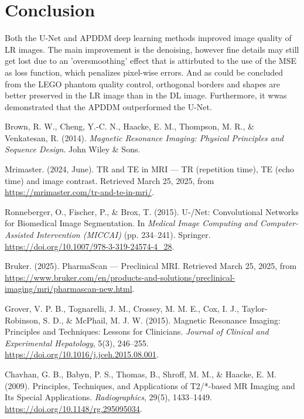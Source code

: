 \documentclass[twocolumn]{article}
\begin{document}
\section{Conclusion}

Both the U-Net and APDDM deep learning methods improved image quality of LR images. The main improvement is the denoising, however fine details may still get lost due to an 'oversmoothing' effect that is attirbuted to the use of the MSE as loss function, which penalizes pixel-wise errors. And as could be concluded from the LEGO phantom quality control, orthogonal borders and shapes are better preserved in the LR image than in the DL image.
Furthermore, it wwas demonstrated that the APDDM outperformed the U-Net.


\newpage
\onecolumn
\nocite{*}
\begin{thebibliography}{99}

     Brown, R. W., Cheng, Y.-C. N., Haacke, E. M., Thompson, M. R., \& Venkatesan, R. (2014). \textit{Magnetic Resonance Imaging: Physical Principles and Sequence Design}. John Wiley \& Sons.
    
     Mrimaster. (2024, June). TR and TE in MRI — TR (repetition time), TE (echo time) and image contrast. Retrieved March 25, 2025, from \url{https://mrimaster.com/tr-and-te-in-mri/}.
    
     Ronneberger, O., Fischer, P., \& Brox, T. (2015). U-/Net: Convolutional Networks for Biomedical Image Segmentation. In \textit{Medical Image Computing and Computer-Assisted Intervention (MICCAI)} (pp. 234–241). Springer. \url{https://doi.org/10.1007/978-3-319-24574-4_28}.
    
     Bruker. (2025). PharmaScan — Preclinical MRI. Retrieved March 25, 2025, from \url{https://www.bruker.com/en/products-and-solutions/preclinical-imaging/mri/pharmascan-new.html}.
    
     Grover, V. P. B., Tognarelli, J. M., Crossey, M. M. E., Cox, I. J., Taylor-Robinson, S. D., \& McPhail, M. J. W. (2015). Magnetic Resonance Imaging: Principles and Techniques: Lessons for Clinicians. \textit{Journal of Clinical and Experimental Hepatology}, 5(3), 246–255. \url{https://doi.org/10.1016/j.jceh.2015.08.001}.
    
     Chavhan, G. B., Babyn, P. S., Thomas, B., Shroff, M. M., \& Haacke, E. M. (2009). Principles, Techniques, and Applications of T2/*-based MR Imaging and Its Special Applications. \textit{Radiographics}, 29(5), 1433–1449. \url{https://doi.org/10.1148/rg.295095034}.
    

\end{thebibliography}
\end{document}
